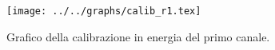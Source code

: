 \begin{figure}[h] \centering\texttt{[image: ../../graphs/calib\_r1.tex]}\caption{Grafico della calibrazione in energia del primo canale.}\label{gr:calib_r1} \end{figure}

